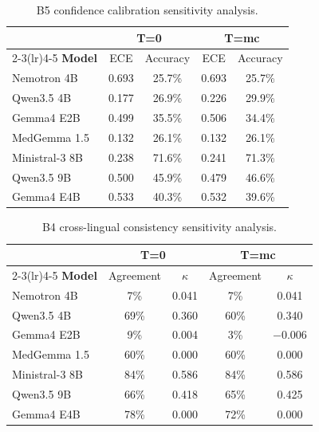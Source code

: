 \begin{table}[tbp]
\centering
\small
\begin{tabular}{lcccc}
\toprule
& \multicolumn{2}{c}{\textbf{T=0}} & \multicolumn{2}{c}{\textbf{T=mc}} \\
\cmidrule(lr){2-3}\cmidrule(lr){4-5}
\textbf{Model} & ECE & Accuracy & ECE & Accuracy \\
\midrule
Nemotron 4B    & 0.693 & 25.7\% & 0.693 & 25.7\% \\
Qwen3.5 4B     & 0.177 & 26.9\% & 0.226 & 29.9\% \\
Gemma4 E2B     & 0.499 & 35.5\% & 0.506 & 34.4\% \\
MedGemma 1.5   & 0.132 & 26.1\% & 0.132 & 26.1\% \\
Ministral-3 8B & 0.238 & 71.6\% & 0.241 & 71.3\% \\
Qwen3.5 9B     & 0.500 & 45.9\% & 0.479 & 46.6\% \\
Gemma4 E4B     & 0.533 & 40.3\% & 0.532 & 39.6\% \\
\bottomrule
\end{tabular}
\caption{B5 confidence calibration sensitivity analysis.}
\label{tab:conclusion-tabib-b5-sensitivity}
\end{table}

\begin{table}[tbp]
\centering
\small
\begin{tabular}{lcccc}
\toprule
& \multicolumn{2}{c}{\textbf{T=0}} & \multicolumn{2}{c}{\textbf{T=mc}} \\
\cmidrule(lr){2-3}\cmidrule(lr){4-5}
\textbf{Model} & Agreement & $\kappa$ & Agreement & $\kappa$ \\
\midrule
Nemotron 4B    & 7\%  & 0.041 & 7\%  & 0.041 \\
Qwen3.5 4B     & 69\% & 0.360 & 60\% & 0.340 \\
Gemma4 E2B     & 9\%  & 0.004 & 3\%  & $-0.006$ \\
MedGemma 1.5   & 60\% & 0.000 & 60\% & 0.000 \\
Ministral-3 8B & 84\% & 0.586 & 84\% & 0.586 \\
Qwen3.5 9B     & 66\% & 0.418 & 65\% & 0.425 \\
Gemma4 E4B     & 78\% & 0.000 & 72\% & 0.000 \\
\bottomrule
\end{tabular}
\caption{B4 cross-lingual consistency sensitivity analysis.}
\label{tab:conclusion-tabib-b4-sensitivity}
\end{table}
